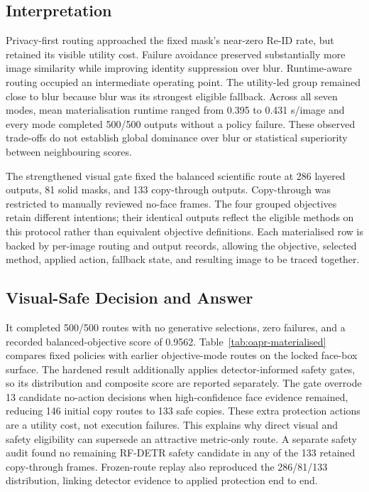 \documentclass[10pt,twocolumn]{IEEEtran}
\begin{document}
\begin{strip}
\vspace{3pt}
\begin{minipage}[t]{0.485\textwidth}

\subsection{Interpretation}

Privacy-first routing approached the fixed mask's near-zero Re-ID rate, but retained
its visible utility cost. Failure avoidance preserved substantially more image
similarity while improving identity suppression over blur. Runtime-aware routing
occupied an intermediate operating point. The utility-led group remained close
to blur because blur was its strongest eligible fallback. Across all seven
modes, mean materialisation runtime ranged from 0.395 to 0.431 s/image and every
mode completed 500/500 outputs without a policy failure. These observed
trade-offs do not establish global dominance over blur or statistical
superiority between neighbouring scores.

The strengthened visual gate fixed the balanced scientific route at 286
layered outputs, 81 solid masks, and 133 copy-through outputs. Copy-through was
restricted to manually reviewed no-face frames.
The four grouped objectives retain different intentions; their identical
outputs reflect the eligible methods on this protocol rather than equivalent
objective definitions. Each materialised row is backed by per-image routing and
output records, allowing the objective, selected method, applied action,
fallback state, and resulting image to be traced together.
\end{minipage}
\hfill
\begin{minipage}[t]{0.485\textwidth}

\subsection{Visual-Safe Decision and Answer}

It completed 500/500 routes with no generative selections, zero failures, and a
recorded balanced-objective score of 0.9562. Table~\ref{tab:oapr-materialised}
compares fixed policies with earlier objective-mode routes on the locked
face-box surface. The hardened result additionally applies detector-informed
safety gates, so its distribution and composite score are reported separately.
The gate overrode 13 candidate no-action decisions when high-confidence face
evidence remained, reducing 146 initial copy routes to 133 safe copies. These
extra protection actions are a utility cost, not execution failures. This
explains why direct visual and safety eligibility can supersede an attractive
metric-only route. A separate safety audit found no remaining RF-DETR safety
candidate in any of the 133 retained copy-through frames. Frozen-route replay
also reproduced the 286/81/133 distribution, linking detector evidence to
applied protection end to end.


\end{minipage}
\end{strip}
\end{document}
